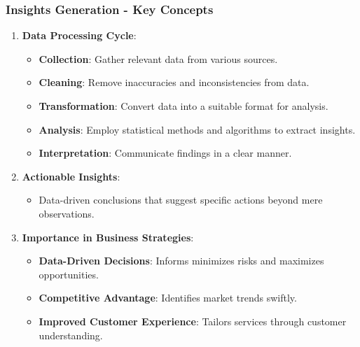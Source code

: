 \documentclass[aspectratio=169]{beamer}
\begin{document}
\begin{frame}[fragile]
    \frametitle{Insights Generation - Key Concepts}
    \begin{enumerate}
        \item \textbf{Data Processing Cycle}:
            \begin{itemize}
                \item \textbf{Collection}: Gather relevant data from various sources.
                \item \textbf{Cleaning}: Remove inaccuracies and inconsistencies from data.
                \item \textbf{Transformation}: Convert data into a suitable format for analysis.
                \item \textbf{Analysis}: Employ statistical methods and algorithms to extract insights.
                \item \textbf{Interpretation}: Communicate findings in a clear manner.
            \end{itemize}

        \item \textbf{Actionable Insights}:
            \begin{itemize}
                \item Data-driven conclusions that suggest specific actions beyond mere observations.
            \end{itemize}

        \item \textbf{Importance in Business Strategies}:
            \begin{itemize}
                \item \textbf{Data-Driven Decisions}: Informs minimizes risks and maximizes opportunities.
                \item \textbf{Competitive Advantage}: Identifies market trends swiftly.
                \item \textbf{Improved Customer Experience}: Tailors services through customer understanding.
            \end{itemize}
    \end{enumerate}
\end{frame}
\end{document}
